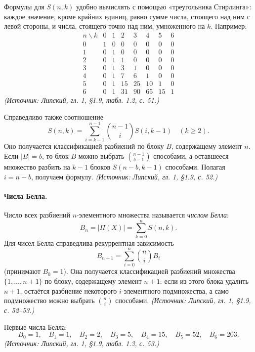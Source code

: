 \documentclass[a4paper,12pt]{article}
\begin{document}
Формулы для \(S(n,k)\) удобно вычислять с помощью «треугольника Стирлинга»: каждое значение, кроме крайних единиц, равно сумме числа, стоящего над ним с левой стороны, и числа, стоящего точно над ним, умноженного на \(k\). Например:
\[
\begin{array}{c|ccccccc}
n\backslash k & 0 & 1 & 2 & 3 & 4 & 5 & 6\\\hline
0 & 1 & 0 & 0 & 0 & 0 & 0 & 0\\
1 & 0 & 1 & 0 & 0 & 0 & 0 & 0\\
2 & 0 & 1 & 1 & 0 & 0 & 0 & 0\\
3 & 0 & 1 & 3 & 1 & 0 & 0 & 0\\
4 & 0 & 1 & 7 & 6 & 1 & 0 & 0\\
5 & 0 & 1 & 15 & 25 & 10 & 1 & 0\\
6 & 0 & 1 & 31 & 90 & 65 & 15 & 1
\end{array}
\]
\textit{(Источник: Липский, гл. 1, §1.9, табл. 1.2, с. 51.)}

Справедливо также соотношение
\[
S(n,k)=\sum_{i=k-1}^{n-1}\binom{n-1}{i}S(i,k-1)\quad(k\ge2).
\]
Оно получается классификацией разбиений по блоку \(B\), содержащему элемент \(n\). Если \(|B|=b\), то блок \(B\) можно выбрать \(\binom{n-1}{b-1}\) способами, а оставшееся множество разбить на \(k-1\) блоков \(S(n-b,k-1)\) способами. Полагая \(i=n-b\), получаем формулу.
\textit{(Источник: Липский, гл. 1, §1.9, с. 52.)}

\paragraph{Числа Белла.}
Число всех разбиений \(n\)-элементного множества называется \emph{числом Белла}:
\[
B_n=|\Pi(X)|=\sum_{k=0}^{n}S(n,k).
\]
Для чисел Белла справедлива рекуррентная зависимость
\[
B_{n+1}=\sum_{i=0}^{n}\binom{n}{i}B_i
\]
(принимают \(B_0=1\)). Она получается классификацией разбиений множества \(\{1,\dots,n+1\}\) по блоку, содержащему элемент \(n+1\): если из этого блока удалить \(n+1\), остаётся разбиение некоторого \(i\)-элементного подмножества, а само подмножество можно выбрать \(\binom{n}{i}\) способами.
\textit{(Источник: Липский, гл. 1, §1.9, с. 52--53.)}

Первые числа Белла:
\[
B_0=1,\quad B_1=1,\quad B_2=2,\quad B_3=5,\quad B_4=15,\quad B_5=52,\quad B_6=203.
\]
\textit{(Источник: Липский, гл. 1, §1.9, табл. 1.3, с. 53.)}
\end{document}
